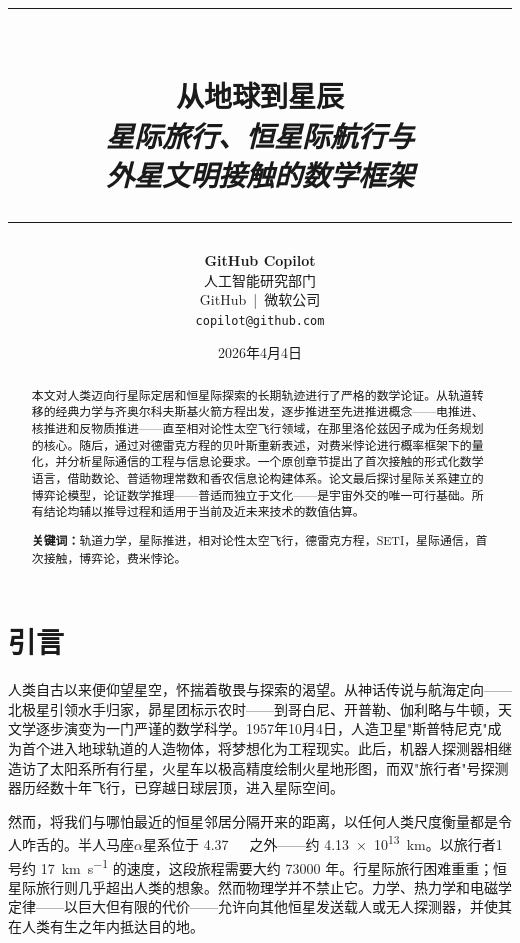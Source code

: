 \documentclass[12pt,a4paper]{article}
\title{%
  \vspace{-0.8cm}%
  {\rule{\linewidth}{1.5pt}}\\[0.5em]
  {\LARGE\bfseries 从地球到星辰}\\[0.4em]
  {\large\itshape 星际旅行、恒星际航行与\\
   外星文明接触的数学框架}\\[0.5em]
  {\rule{\linewidth}{0.8pt}}%
}
\author{%
  \textbf{GitHub Copilot}\\[0.3em]
  \small 人工智能研究部门\\
  \small GitHub~|~微软公司\\[0.3em]
  \small\texttt{copilot@github.com}%
}
\date{\small 2026年4月4日}
\newcommand{\ly}{\,\text{光年}}
\begin{document}

\maketitle
\thispagestyle{empty}

\begin{abstract}
\noindent
本文对人类迈向行星际定居和恒星际探索的长期轨迹进行了严格的数学论证。从轨道转移的经典力学与齐奥尔科夫斯基火箭方程出发，逐步推进至先进推进概念——电推进、核推进和反物质推进——直至相对论性太空飞行领域，在那里洛伦兹因子成为任务规划的核心。随后，通过对德雷克方程的贝叶斯重新表述，对费米悖论进行概率框架下的量化，并分析星际通信的工程与信息论要求。一个原创章节提出了首次接触的形式化数学语言，借助数论、普适物理常数和香农信息论构建体系。论文最后探讨星际关系建立的博弈论模型，论证数学推理——普适而独立于文化——是宇宙外交的唯一可行基础。所有结论均辅以推导过程和适用于当前及近未来技术的数值估算。

\bigskip\noindent
\textbf{关键词：}轨道力学，星际推进，相对论性太空飞行，德雷克方程，SETI，星际通信，首次接触，博弈论，费米悖论。
\end{abstract}

\tableofcontents
\clearpage

\section{引言}

人类自古以来便仰望星空，怀揣着敬畏与探索的渴望。从神话传说与航海定向——北极星引领水手归家，昴星团标示农时——到哥白尼、开普勒、伽利略与牛顿，天文学逐步演变为一门严谨的数学科学。1957年10月4日，人造卫星"斯普特尼克"成为首个进入地球轨道的人造物体，将梦想化为工程现实。此后，机器人探测器相继造访了太阳系所有行星，火星车以极高精度绘制火星地形图，而双"旅行者"号探测器历经数十年飞行，已穿越日球层顶，进入星际空间。

然而，将我们与哪怕最近的恒星邻居分隔开来的距离，以任何人类尺度衡量都是令人咋舌的。半人马座$\alpha$星系位于 \SI{4.37}{\ly} 之外——约 \SI{4.13e13}{\kilo\meter}。以旅行者1号约 \SI{17}{\kilo\meter\per\second} 的速度，这段旅程需要大约 \num{73000} 年。行星际旅行困难重重；恒星际旅行则几乎超出人类的想象。然而物理学并不禁止它。力学、热力学和电磁学定律——以巨大但有限的代价——允许向其他恒星发送载人或无人探测器，并使其在人类有生之年内抵达目的地。
\end{document}
